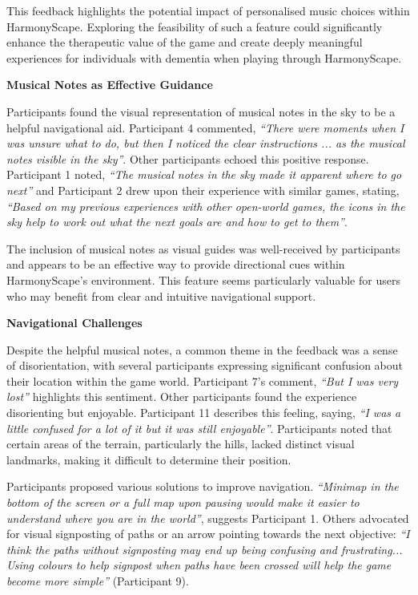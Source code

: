 \documentclass{l4proj}
\begin{document}
This feedback highlights the potential impact of personalised music choices within HarmonyScape. Exploring the feasibility of such a feature could significantly enhance the therapeutic value of the game and create deeply meaningful experiences for individuals with dementia when playing through HarmonyScape.
\newline

\textbf{Musical Notes as Effective Guidance}

Participants found the visual representation of musical notes in the sky to be a helpful navigational aid. Participant 4 commented, \emph{“There were moments when I was unsure what to do, but then I noticed the clear instructions ... as the musical notes visible in the sky”}. Other participants echoed this positive response. Participant 1 noted, \emph{“The musical notes in the sky made it apparent where to go next”} and Participant 2 drew upon their experience with similar games, stating, \emph{“Based on my previous experiences with other open-world games, the icons in the sky help to work out what the next goals are and how to get to them”}.

The inclusion of musical notes as visual guides was well-received by participants and appears to be an effective way to provide directional cues within HarmonyScape's environment. This feature seems particularly valuable for users who may benefit from clear and intuitive navigational support.
\newline

\textbf{Navigational Challenges}

Despite the helpful musical notes, a common theme in the feedback was a sense of disorientation, with several participants expressing significant confusion about their location within the game world. Participant 7's comment, \emph{“But I was very lost”} highlights this sentiment. Other participants found the experience disorienting but enjoyable. Participant 11 describes this feeling, saying, \emph{“I was a little confused for a lot of it but it was still enjoyable”}. Participants noted that certain areas of the terrain, particularly the hills, lacked distinct visual landmarks, making it difficult to determine their position.

Participants proposed various solutions to improve navigation. \emph{“Minimap in the bottom of the screen or a full map upon pausing would make it easier to understand where you are in the world”}, suggests Participant 1. Others advocated for visual signposting of paths or an arrow pointing towards the next objective: \emph{“I think the paths without signposting may end up being confusing and frustrating... Using colours to help signpost when paths have been crossed will help the game become more simple”} (Participant 9).
\end{document}
